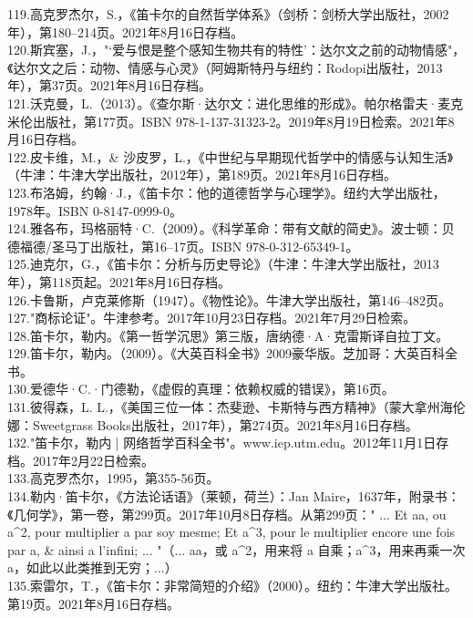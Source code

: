 119.高克罗杰尔，S.，《笛卡尔的自然哲学体系》（剑桥：剑桥大学出版社，2002年），第180–214页。2021年8月16日存档。\\
120.斯宾塞，J.，"‘爱与恨是整个感知生物共有的特性’：达尔文之前的动物情感"，《达尔文之后：动物、情感与心灵》（阿姆斯特丹与纽约：Rodopi出版社，2013年），第37页。2021年8月16日存档。\\
121.沃克曼，L.（2013）。《查尔斯·达尔文：进化思维的形成》。帕尔格雷夫·麦克米伦出版社，第177页。ISBN 978-1-137-31323-2。2019年8月19日检索。2021年8月16日存档。\\
122.皮卡维，M.，& 沙皮罗，L.，《中世纪与早期现代哲学中的情感与认知生活》（牛津：牛津大学出版社，2012年），第189页。2021年8月16日存档。\\
123.布洛姆，约翰·J.，《笛卡尔：他的道德哲学与心理学》。纽约大学出版社，1978年。ISBN 0-8147-0999-0。\\
124.雅各布，玛格丽特·C.（2009）。《科学革命：带有文献的简史》。波士顿：贝德福德/圣马丁出版社，第16–17页。ISBN 978-0-312-65349-1。\\
125.迪克尔，G.，《笛卡尔：分析与历史导论》（牛津：牛津大学出版社，2013年），第118页起。2021年8月16日存档。\\
126.卡鲁斯，卢克莱修斯（1947）。《物性论》。牛津大学出版社，第146–482页。\\
127."商标论证"。牛津参考。2017年10月23日存档。2021年7月29日检索。\\
128.笛卡尔，勒内。《第一哲学沉思》第三版，唐纳德·A·克雷斯译自拉丁文。\\
129.笛卡尔，勒内。（2009）。《大英百科全书》2009豪华版。芝加哥：大英百科全书。\\
130.爱德华·C.·门德勒，《虚假的真理：依赖权威的错误》，第16页。\\
131.彼得森，L. L.，《美国三位一体：杰斐逊、卡斯特与西方精神》（蒙大拿州海伦娜：Sweetgrass Books出版社，2017年），第274页。2021年8月16日存档。\\
132."笛卡尔，勒内 | 网络哲学百科全书"。www.iep.utm.edu。2012年11月1日存档。2017年2月22日检索。\\
133.高克罗杰尔，1995，第355-56页。\\
134.勒内·笛卡尔，《方法论话语》（莱顿，荷兰）：Jan Maire，1637年，附录书：《几何学》，第一卷，第299页。2017年10月8日存档。从第299页：" ... Et aa, ou a^2, pour multiplier a par soy mesme; Et a^3, pour le multiplier encore une fois par a, & ainsi a l'infini; ... "（... aa，或 a^2，用来将 a 自乘；a^3，用来再乘一次 a，如此以此类推到无穷；...）\\
135.索雷尔，T.，《笛卡尔：非常简短的介绍》（2000）。纽约：牛津大学出版社。第19页。2021年8月16日存档。\\
